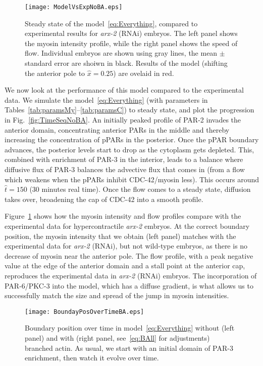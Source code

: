 \documentclass[11pt]{article}
\newcommand{\6}[1]{#1_{\text{6}}}
\newcommand{\3}[1]{#1_{\text{3}}}
\begin{document}
\begin{figure}
\centering
\texttt{[image: ModelVsExpNoBA.eps]}
\caption{\label{fig:StStNoBA}Steady state of the model\ \eqref{eq:Everything}, compared to experimental results for \emph{arx-2} (RNAi) embryos. The left panel shows the myosin intensity profile, while the right panel shows the speed of flow. Individual embryos are shown using gray lines, the mean $\pm$ standard error are shoiwn in black. Results of the model (shifting the anterior pole to $\hat x = 0.25$) are ovelaid in red.}
\end{figure}

We now look at the performance of this model compared to the experimental data. We simulate the model\ \eqref{eq:Everything} (with parameters in Tables\ \ref{tab:paramsMy}--\ref{tab:paramsC}) to steady state, and plot the progression in Fig.\ \ref{fig:TimeSeqNoBA}. An initially peaked profile of PAR-2 invades the anterior domain, concentrating anterior PARs in the middle and thereby increasing the concentration of pPARs in the posterior. Once the pPAR boundary advances, the posterior levels start to drop as the cytoplasm gets depleted. This, combined with enrichment of PAR-3 in the interior, leads to a balance where diffusive flux of PAR-3 balances the advective flux that comes in (from a flow which weakens when the pPARs inhibit CDC-42/myosin less). This occurs around $\hat t = 150$ (30 minutes real time). Once the flow comes to a steady state, diffusion takes over, broadening the cap of CDC-42 into a smooth profile.

Figure\ \ref{fig:StStNoBA} shows how the myosin intensity and flow profiles compare with the experimental data for hypercontractile \emph{arx-2} embryos. At the correct boundary position, the myosin intensity that we obtain (left panel) matches with the experimental data for \emph{arx-2} (RNAi), but not wild-type embryos, as there is no decrease of myosin near the anterior pole. The flow profile, with a peak negative value at the edge of the anterior domain and a stall point at the anterior cap, reproduces the experimental data in \emph{arx-2} (RNAi) embryos. The incorporation of PAR-6/PKC-3 into the model, which has a diffuse gradient, is what allows us to successfully match the size and spread of the jump in myosin intensities.

\begin{figure}
\centering
\texttt{[image: BoundayPosOverTimeBA.eps]}
\caption{\label{fig:BPosBA}Boundary position over time in model\ \eqref{eq:Everything} without (left panel) and with (right panel, see\ \eqref{eq:BAll} for adjustments) branched actin. As usual, we start with an initial domain of PAR-3 enrichment, then watch it evolve over time. }
\end{figure}
\end{document}
